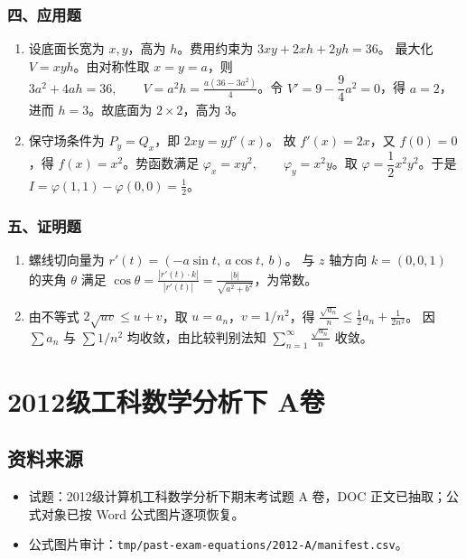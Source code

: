 \subsubsection*{四、应用题}
\begin{enumerate}
  \item 设底面长宽为 $x,y$，高为 $h$。费用约束为 \(\displaystyle 3xy+2xh+2yh=36\)。
  最大化 $V=xyh$。由对称性取 $x=y=a$，则
  \(\displaystyle 3a^2+4ah=36,\qquad V=a^2h=\frac{a(36-3a^2)}4\)。令 $V'=9-\dfrac94a^2=0$，得 $a=2$，进而 $h=3$。故底面为 $2\times2$，高为 $3$。
  \item 保守场条件为 $P_y=Q_x$，即 \(\displaystyle 2xy=yf'(x)\)。
  故 $f'(x)=2x$，又 $f(0)=0$，得 $f(x)=x^2$。势函数满足
  \(\displaystyle \varphi_x=xy^2,\qquad \varphi_y=x^2y\)。取 $\varphi=\dfrac12x^2y^2$。于是
  \(\displaystyle I=\varphi(1,1)-\varphi(0,0)=\frac12\)。
\end{enumerate}

\subsubsection*{五、证明题}
\begin{enumerate}
  \item 螺线切向量为 \(\displaystyle r'(t)=(-a\sin t,\ a\cos t,\ b)\)。
  与 $z$ 轴方向 $k=(0,0,1)$ 的夹角 $\theta$ 满足
  \(\displaystyle \cos\theta=\frac{|r'(t)\cdot k|}{|r'(t)|}=\frac{|b|}{\sqrt{a^2+b^2}}\)，为常数。
  \item 由不等式 $2\sqrt{uv}\le u+v$，取 $u=a_n$，$v=1/n^2$，得
  \(\displaystyle \frac{\sqrt{a_n}}{n}\le\frac12a_n+\frac1{2n^2}\)。
  因 $\sum a_n$ 与 $\sum1/n^2$ 均收敛，由比较判别法知
  \(\displaystyle \sum_{n=1}^{\infty}\frac{\sqrt{a_n}}{n}\) 收敛。
\end{enumerate}

\section{2012级工科数学分析下 A卷}

\subsection{资料来源}
\begin{itemize}
  \item 试题：2012级计算机工科数学分析下期末考试题 A 卷，DOC 正文已抽取；公式对象已按 Word 公式图片逐项恢复。
  \item 公式图片审计：\texttt{tmp/past-exam-equations/2012-A/manifest.csv}。
\end{itemize}

